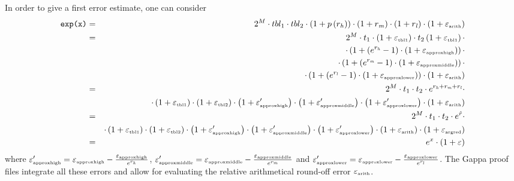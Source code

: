 In order to give a first error estimate, one can consider
\begin{eqnarray*}
\mbox{\tt exp(x)} & = & 2^M \cdot tbl_1 \cdot tbl_2 \cdot \left( 1 +
p\left( r_\hi \right) \right) \cdot \left( 1 + r_\mi \right) \cdot
\left( 1 + r_\lo \right) \cdot \left( 1 + \epsilon_{\mbox{\tiny
arith}} \right) \\ & = & 2^M \cdot t_1 \cdot \left( 1 +
\epsilon_{\mbox{\tiny tbl1}} \right) \cdot t_2 \left( 1 +
\epsilon_{\mbox{\tiny tbl1}} \right) \cdot \\ & & \cdot \left( 1 +
\left( e^{r_\hi} - 1 \right) \cdot \left( 1 + \epsilon_{\mbox{\tiny
approxhigh}} \right) \right) \cdot \\ & & \cdot \left( 1 + \left(
e^{r_\mi} - 1 \right) \cdot \left( 1 + \epsilon_{\mbox{\tiny
approxmiddle}} \right) \right) \cdot \\ & & \cdot \left( 1 + \left(
e^{r_\lo} - 1 \right) \cdot \left( 1 + \epsilon_{\mbox{\tiny
approxlower}} \right) \right) \cdot \left( 1 + \epsilon_{\mbox{\tiny
arith}} \right) \\ & = & 2^M \cdot t_1 \cdot t_2 \cdot e^{r_\hi +
r_\mi + r_\lo} \cdot \\ & & \cdot \left( 1 + \epsilon_{\mbox{\tiny
tbl1}} \right) \cdot \left( 1 + \epsilon_{\mbox{\tiny tbl2}} \right)
\cdot \left( 1 + \epsilon_{\mbox{\tiny approxhigh}}^\prime \right)
\cdot \left( 1 + \epsilon_{\mbox{\tiny approxmiddle}}^\prime \right)
\cdot \left( 1 + \epsilon_{\mbox{\tiny approxlower}}^\prime \right)
\cdot \left( 1 + \epsilon_{\mbox{\tiny arith}} \right) \\ & = & 2^M
\cdot t_1 \cdot t_2 \cdot e^{\hat{r}} \cdot \\ & & \cdot \left( 1 +
\epsilon_{\mbox{\tiny tbl1}} \right) \cdot \left( 1 +
\epsilon_{\mbox{\tiny tbl2}} \right) \cdot \left( 1 +
\epsilon_{\mbox{\tiny approxhigh}}^\prime \right) \cdot \left( 1 +
\epsilon_{\mbox{\tiny approxmiddle}}^\prime \right) \cdot \left( 1 +
\epsilon_{\mbox{\tiny approxlower}}^\prime \right) \cdot \left( 1 +
\epsilon_{\mbox{\tiny arith}} \right) \cdot \left( 1 +
\epsilon_{\mbox{\tiny argred}} \right) \\ & = & e^x \cdot \left( 1 +
\epsilon \right)
\end{eqnarray*}
where $\epsilon_{\mbox{\tiny approxhigh}}^\prime =
\epsilon_{\mbox{\tiny approxhigh}} - \frac{\epsilon_{\mbox{\tiny
approxhigh}}}{e^{r_\hi}}$, $\epsilon_{\mbox{\tiny
approxmiddle}}^\prime = \epsilon_{\mbox{\tiny approxmiddle}} -
\frac{\epsilon_{\mbox{\tiny approxmiddle}}}{e^{r_\mi}}$ and
$\epsilon_{\mbox{\tiny approxlower}}^\prime = \epsilon_{\mbox{\tiny
approxlower}} - \frac{\epsilon_{\mbox{\tiny
approxlower}}}{e^{r_\lo}}$.  The Gappa proof files integrate all these
errors and allow for evaluating the relative arithmetical round-off
error $\epsilon_{\mbox{\tiny arith}}$.

